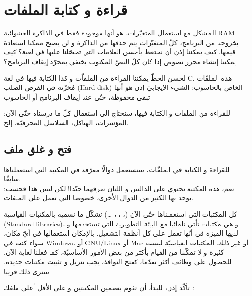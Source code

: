 \chapter{قراءة و كتابة الملفات}

المشكل مع استعمال المتغيّرات، هو أنها موجودة فقط في الذاكرة العشوائية
\textenglish{RAM}.
بخروجنا من البرنامج، كلّ المتغيّرات يتم حذفها من الذاكرة و لن يصبح ممكنا استعادة قيمها. كيف يمكننا إذن أن نحتفظ بأحسن العلامات التي تحصّلنا عليها في لعبة؟ كيف يمكننا إنشاء محرر نصوص إذا كان كلّ النصّ  المكتوب يختفي بمجرّد إيقاف البرنامج؟

لحسن الحظّ يمكننا القراءة من الملفاّت و كذا الكتابة فيها في لغة
\textenglish{C}.
هذه الملفّات مُخزّنة في القرص الصلب
(\textenglish{Hard disk})
الخاص بالحاسوب: الشيء الإيجابيّ إذن هو أنها تبقى محفوظة، حتّى عند إيقاف البرنامج أو الحاسوب.

للقراءة من الملفات و الكتابة فيها، سنحتاج إلى استعمال كلّ ما درسناه حتّى الآن: المؤشرات، الهياكل، السلاسل المحرفيّة، إلخ.

\section{فتح و غلق ملف}

للقراءة و الكتابة في الملفّات، سنستعمل دوالًا معرّفة في المكتبة
التي استعملناها سابقًا.\\
نعم، هذه المكتبة تحتوي على الدالتين
و
اللتان نعرفهما جيّدا! لكن ليس هذا فحسب: يوجد بها الكثير من الدوال الأخرى، خصوصا التي تعمل على الملفات.

\begin{information}
  كل المكتبات التي استعملناها حتّى الآن
(، ، ،  \dots)
تشكّل ما نسميه بالمكتبات القياسية
(\textenglish{Standard libraries})،
و هي مكتبات تأتي تلقائيا مع البيئة التطويرية التي تستخدمها و لديها الميزة في أنّها تعمل على كل أنظمة التشغيل. بالإمكان استعمالها في أيّ مكان، سواء كنت في
\textenglish{Windows}،
أو
\textenglish{GNU/Linux}
أو
\textenglish{Mac}
أو غير ذلك.
المكتبات القياسيّة ليست كثيرة و لا تمكّننا من القيام بأكثر من بعض الأمور الأساسيّة، كما فعلنا لغاية الآن. للحصول على وظائف أكثر تقدّما، كفتح النوافذ، يجب تنزيل و تثبيت مكتبات جديدة. سنرى ذلك قريبا!
\end{information}

تأكّد إذن، للبدأ، أن تقوم بتضمين المكتبتين
و
على الأقل أعلى ملفك
:

